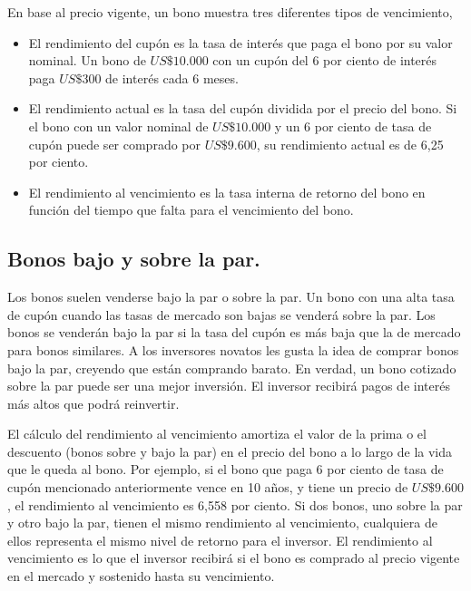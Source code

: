 \hspace*{0.4 cm} En base al precio vigente, un bono muestra tres diferentes tipos de vencimiento,

\begin{itemize}
  \item El rendimiento del cup\'on es la tasa de inter\'es que paga el bono por su valor nominal. Un bono de $US\$10.000$ con un cup\'on del 6 por ciento de inter\'es paga $US\$300$ de inter\'es cada 6 meses.
  \item El rendimiento actual es la tasa del cup\'on dividida por el precio del bono. Si el bono con un valor nominal de $US\$10.000$ y un 6 por ciento de tasa de cup\'on puede ser comprado por $US\$9.600$, su rendimiento actual es de 6,25 por ciento. 
  \item El rendimiento al vencimiento es la tasa interna de retorno del bono en funci\'on del tiempo que falta para el vencimiento del bono.
\end{itemize}


\subsection{Bonos bajo y sobre la par.\\}

\hspace*{0.4 cm} Los bonos suelen venderse bajo la par o sobre la par. Un bono con una alta tasa de cup\'on cuando las tasas de mercado son bajas se vender\'a sobre la par. Los bonos se vender\'an bajo la par si la tasa del cup\'on es m\'as baja que la de mercado para bonos similares. A los inversores novatos les gusta la idea de comprar bonos bajo la par, creyendo que est\'an comprando barato. En verdad, un bono cotizado sobre la par puede ser una mejor inversi\'on. El inversor recibir\'a pagos de inter\'es m\'as altos que podr\'a reinvertir.

\hspace*{0.4 cm} El c\'alculo del rendimiento al vencimiento amortiza el valor de la prima o el descuento (bonos sobre y bajo la par) en el precio del bono a lo largo de la vida que le queda al bono. Por ejemplo, si el bono que paga 6 por ciento de tasa de cup\'on mencionado anteriormente vence en 10 a\~nos, y tiene un precio de $US\$9.600$, el rendimiento al vencimiento es 6,558 por ciento. Si dos bonos, uno sobre la par y otro bajo la par, tienen el mismo rendimiento al vencimiento, cualquiera de ellos representa el mismo nivel de retorno para el inversor. El rendimiento al vencimiento es lo que el inversor recibir\'a si el bono es comprado al precio vigente en el mercado y sostenido hasta su vencimiento.

